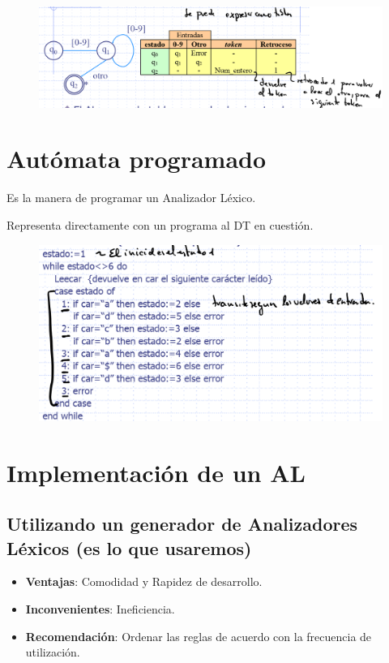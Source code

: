 \documentclass[12pt]{report} %
\begin{document}
\begin{figure}[H]
	{\includegraphics[scale=.25]{Untitled 31.png}}
\end{figure}

\section{Autómata programado}

Es la manera de programar un Analizador Léxico.

Representa directamente con un programa al DT en cuestión.

\begin{figure}[H]
	{\includegraphics[scale=.3]{Untitled 32.png}}
\end{figure}

\section{Implementación de un AL}

\subsection{Utilizando un generador de Analizadores Léxicos (es lo que usaremos)}

\begin{itemize}
\item
  \textbf{Ventajas}: Comodidad y Rapidez de desarrollo.
\item
  \textbf{Inconvenientes}: Ineficiencia.
\item
  \textbf{Recomendación}: Ordenar las reglas de acuerdo con la frecuencia
  de utilización.
\end{itemize}
\end{document}
